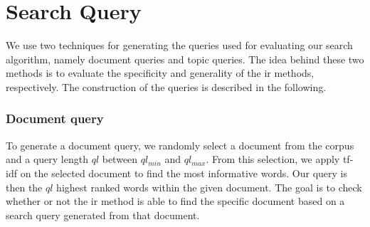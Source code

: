 \section{Search Query}\label{sec:query}

We use two techniques for generating the queries used for evaluating our search algorithm, namely document queries and topic queries.
The idea behind these two methods is to evaluate the specificity and generality of the \gls{ir} methods, respectively.
The construction of the queries is described in the following.

\subsubsection{Document query}\label{subsec:query_gen_doc}
To generate a document query, we randomly select a document from the corpus and a query length $ql$ between $ql_{min}$ and $ql_{max}$.
From this selection, we apply \gls{tf-idf} on the selected document to find the most informative words.
Our query is then the $ql$ highest ranked words within the given document.
The goal is to check whether or not the \gls{ir} method is able to find the specific document based on a search query generated from that document.

